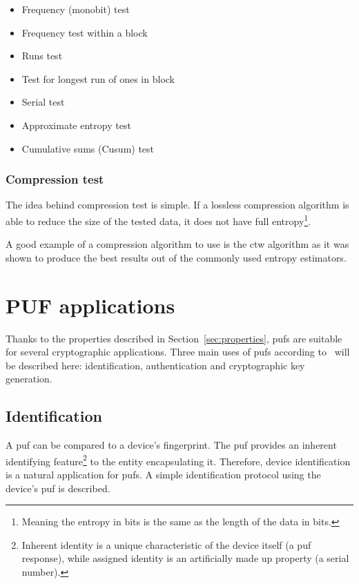 \begin{itemize}
    \item Frequency (monobit) test
    \item Frequency test within a block
    \item Runs test
    \item Test for longest run of ones in block
    \item Serial test
    \item Approximate entropy test
    \item Cumulative sums (Cusum) test
\end{itemize}

\subsubsection*{Compression test}

The idea behind compression test is simple. If a lossless compression algorithm is able to reduce the size of the tested data, it does not have full entropy\footnote{Meaning the entropy in bits is the same as the length of the data in bits.}\cite{Leest2010}.

A good example of a compression algorithm to use is the \gls{ctw} algorithm as it was shown to produce the best results out of the commonly used entropy estimators\cite{Yun2008}.

\section{PUF applications}\label{sec:puf_applications}

Thanks to the properties described in Section~\ref{sec:properties}, \glspl{puf} are suitable for several cryptographic applications. Three main uses of \glspl{puf} according to~\cite{Maes2012} will be described here: identification, authentication and cryptographic key generation.


\subsection{Identification}\label{sec:identification}

A \gls{puf} can be compared to a device's fingerprint. The \gls{puf} provides an inherent identifying feature\footnote{Inherent identity is a unique characteristic of the device itself (a \gls{puf} response), while assigned identity is an artificially made up property (a serial number).} to the entity encapsulating it.  Therefore, device identification is a natural application for \glspl{puf}. A simple identification protocol using the device's \gls{puf} is described.

